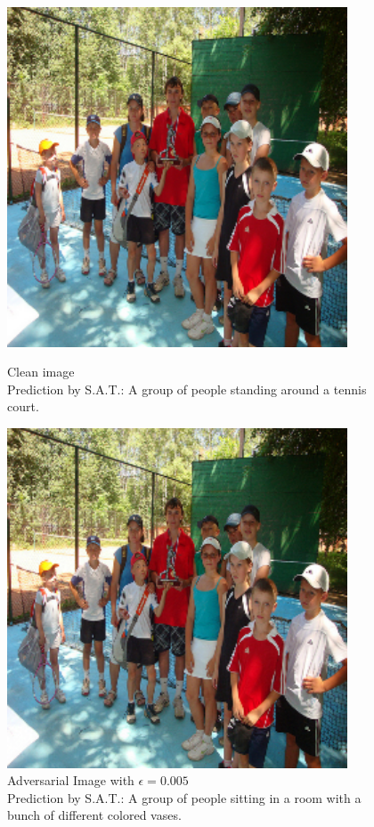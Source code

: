 \begin{figure}[ht]
    \centering
    \begin{minipage}{0.45\textwidth}
        \centering
        \includegraphics[width=0.9\textwidth]{figures/fast_method_group_of_people/group_of_people_0.000.png} %
        \caption*{Clean image\\Prediction by S.A.T.: A group of people standing around a tennis court.}
    \end{minipage}\hfill
    \begin{minipage}{0.45\textwidth}
        \centering
        \includegraphics[width=0.9\textwidth]{figures/fast_method_group_of_people/group_of_people_0.005.png} %
        \caption*{Adversarial Image with $\epsilon=0.005$\\Prediction by S.A.T.: A group of people sitting in a room with a bunch of different colored vases.}
    \end{minipage}
\end{figure}

